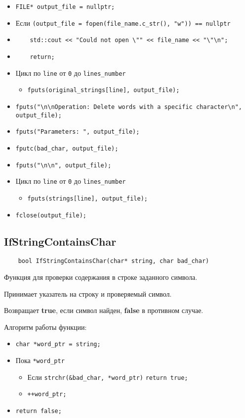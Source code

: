 \begin{itemize}
	\item \verb|FILE* output_file = nullptr;|
    \item Если \verb|(output_file = fopen(file_name.c_str(), "w")) == nullptr|
    \item \verb|    std::cout << "Could not open \"" << file_name << "\"\n";|
    \item \verb|    return;|
	\item Цикл по \verb|line| от \verb|0| до \verb|lines_number|
		\begin{itemize}
			\item \verb|fputs(original_strings[line], output_file);|
		\end{itemize}
    \item \verb|fputs("\n\nOperation: Delete words with a specific character\n", output_file);|
    \item \verb|fputs("Parameters: ", output_file);|
    \item \verb|fputc(bad_char, output_file);|
    \item \verb|fputs("\n\n", output_file);|
	\item Цикл по \verb|line| от \verb|0| до \verb|lines_number|
		\begin{itemize}
			\item \verb|fputs(strings[line], output_file);|
		\end{itemize}
    \item \verb|fclose(output_file);|
\end{itemize}

\subsection*{IfStringContainsChar}

\begin{lstlisting}
	bool IfStringContainsChar(char* string, char bad_char)
\end{lstlisting}

Функция для проверки содержания в строке заданного символа.

Принимает указатель на строку и проверяемый символ.

Возвращает \textbf{true}, если символ найден, \textbf{false} в противном случае.

Алгоритм работы функции:

\begin{itemize}
    \item \verb|char *word_ptr = string;|
	\item Пока \verb|*word_ptr|
		\begin{itemize}
			\item Если \verb|strchr(&bad_char, *word_ptr)|
			\subitem \verb|return true;|
			\item \verb|++word_ptr;|
		\end{itemize}
    \item \verb|return false;|
\end{itemize}

